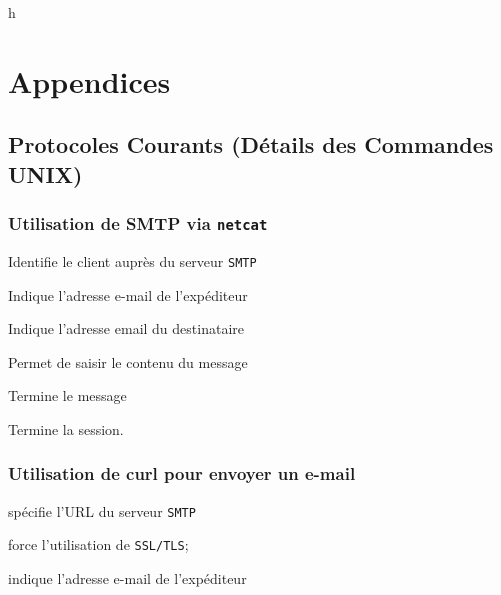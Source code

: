 \documentclass[a4paper]{report}
\begin{document}



     h\backmatter
\chapter{Appendices}
\section{Protocoles Courants (Détails des Commandes UNIX)}%
\selectfont

\subsection{Utilisation de SMTP via \texttt{netcat}}
      Identifie le client auprès du serveur \texttt{SMTP} 

      Indique l'adresse e-mail de l'expéditeur

     Indique l'adresse email du destinataire

     Permet de saisir le contenu du message

     Termine le message 


     Termine la session. 

    \subsection{Utilisation de curl pour envoyer un e-mail}
 spécifie l'URL du serveur \texttt{SMTP}    

     force l'utilisation de \texttt{SSL/TLS};  

     indique l'adresse e-mail de l'expéditeur 
\end{document}

